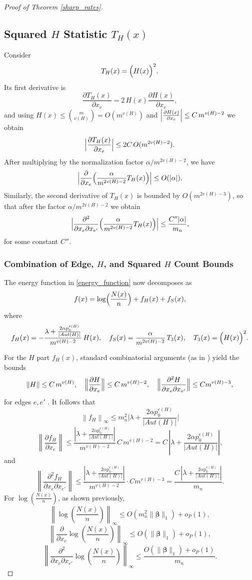 \documentclass[12pt]{article}
\numberwithin{equation}{section}
\def\bbeta{\boldsymbol{\beta}}
\begin{document}
\begin{proof}[Proof of Theorem \ref{sharp_rates}]
\subsection*{Squared \(H\) Statistic \(T_H(x)\)}
Consider
\[
T_H(x)=\Bigl(H(x)\Bigr)^2.
\]
Its first derivative is
\[
\frac{\partial T_H(x)}{\partial x_{e}} = 2\, H(x) \frac{\partial H(x)}{\partial x_{e}},
\]
and using \(H(x)\le \binom{m}{v(H)}=O(m^{v(H)})\) and \(\Bigl|\frac{\partial H(x)}{\partial x_{e}}\Bigr|\le C\,m^{v(H)-2}\) we obtain
\[
\Bigl|\frac{\partial T_H(x)}{\partial x_{e}}\Bigr|\le 2C\, O(m^{2v(H)-2}).
\]
After multiplying by the normalization factor \(\alpha/m^{2v(H)-2}\), we have
\[
\Bigl|\frac{\partial}{\partial x_{e}}\Bigl(\frac{\alpha}{m^{2v(H)-2}}T_H(x)\Bigr)\Bigr|\le O(|\alpha|).
\]
Similarly, the second derivative of \(T_H(x)\) is bounded by \(O(m^{2v(H)-3})\), so that after the factor \(\alpha/m^{2v(H)-2}\) we obtain
\[
\Bigl|\frac{\partial^2}{\partial x_{e}\partial x_{e'}}\Bigl(\frac{\alpha}{m^{2v(H)-2}}T_H(x)\Bigr)\Bigr|\le \frac{C''|\alpha|}{m_n},
\]
for some constant \(C''\).





\subsubsection*{Combination of Edge, \(H\), and Squared \(H\) Count Bounds}

The energy function in \eqref{energy_function} now decomposes as
\[
f(x)=\log\Bigl(\frac{N(x)}{n}\Bigr)+f_H(x)+f_S(x),
\]
where
\[
f_H(x)=-\frac{\lambda+\frac{2\alpha p_0^{e(H)}}{\lvert Aut(H)\rvert}}{m^{v(H)-2}}\,H(x),\quad
f_S(x)=\frac{\alpha}{m^{2v(H)-2}}\,T_3(x),\quad 
T_3(x)=\Bigl(H(x)\Bigr)^2.
\]

For the \(H\) part \(f_H(x)\), standard combinatorial arguments (as in \cite{chatterjee2016nonlinear}) yield the bounds
\[
\|H\| \le C\, m^{v(H)},\quad
\Bigl\|\frac{\partial H}{\partial x_e}\Bigr\|\le C\, m^{v(H)-2},\quad
\Bigl\|\frac{\partial^2 H}{\partial x_e\partial x_{e'}}\Bigr\|\le Cm^{v(H)-3},
\]
for edges \(e,e'\) . It follows that
\[
\left\|f_H\right\|_\infty \leq m_n^2 \lvert \lambda+\frac{2\alpha p_0^{e(H)}}{\lvert Aut(H)\rvert}\rvert
\]
\[
\left\|\frac{\partial f_H}{\partial x_e}\right\| \le \frac{|\lambda+\frac{2\alpha p_0^{e(H)}}{\lvert Aut(H)\rvert}|}{m^{v(H)-2}}\,C\,m^{v(H)-2} = C\,|\lambda + \frac{2\alpha p_0^{e(H)}}{\lvert Aut(H)\rvert}|,
\]
and
\[
\left\|\frac{\partial^2 f_H}{\partial x_e\partial x_{e'}}\right\| \le \frac{|\lambda + \frac{2\alpha p_0^{e(H)}}{\lvert Aut(H)\rvert}|}{m^{v(H)-2}}\cdot Cm^{v(H)-3} = \frac{C\,|\lambda + \frac{2\alpha p_0^{e(H)}}{\lvert Aut(H)\rvert}|}{m_n}.
\]
For \(\log\left(\frac{N(x)}{n}\right)\), as shown previously,
\[
\left\|\log\left(\frac{N(x)}{n}\right)\right\|_\infty \le O(m_n^2\|\bbeta\|_1) + o_P(1),
\]
\[
\left\|\frac{\partial}{\partial x_e}\log\left(\frac{N(x)}{n}\right)\right\|_\infty \le O(\|\bbeta\|_1) + o_P(1),
\]
\[
\left\|\frac{\partial^2}{\partial x_e \partial x_{e'}}\log\left(\frac{N(x)}{n}\right)\right\|_\infty \le  \frac{O(\|\bbeta\|_1)+o_P(1)}{m_n}.
\]


\end{proof}
\end{document}
